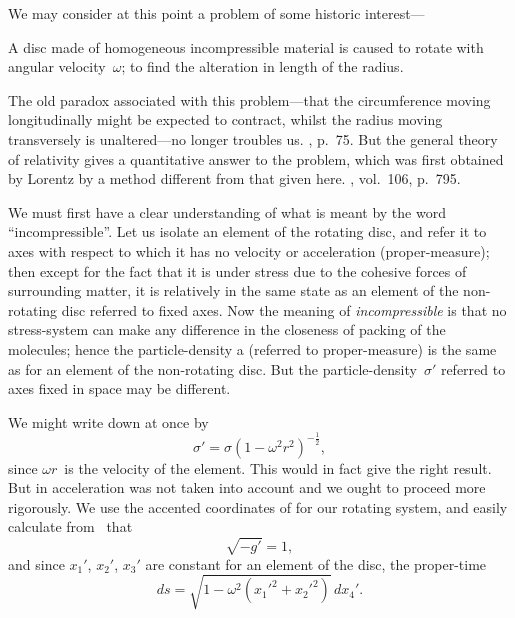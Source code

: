 \documentclass[12pt]{book}
\begin{document}
%
%

We may consider at this point a problem of some historic interest---

A disc made of homogeneous incompressible material is caused to rotate
with angular velocity~$\omega$; to find the alteration in length of the radius.

The old paradox associated with this problem---that the circumference
moving longitudinally might be expected to contract, whilst the radius moving
transversely is unaltered---no longer troubles us\footnotemark.\footnotetext
  {, p.~75.}
But the general theory of
relativity gives a quantitative answer to the problem, which was first obtained
by Lorentz by a method different from that given here\footnotemark.\footnotetext
  {, vol.~106, p.~795.}

We must first have a clear understanding of what is meant by the word
%
``incompressible''. Let us isolate an element of the rotating disc, and refer it to
axes with respect to which it has no velocity or acceleration (proper-measure);
then except for the fact that it is under stress due to the cohesive forces of
surrounding matter, it is relatively in the same state as an element of the
non-rotating disc referred to fixed axes. Now the meaning of \emph{incompressible}
is that no stress-system can make any difference in the closeness of packing
of the molecules; hence the particle-density a (referred to proper-measure)
is the same as for an element of the non-rotating disc. But the particle-density~$\sigma'$
referred to axes fixed in space may be different.

We might write down at once by~
\[
\sigma' = \sigma (1 - \omega^{2} r^{2})^{-\frac{1}{2}},
\]
since $\omega r$~is the velocity of the element. This would in fact give the right
result. But in  acceleration was not taken into account and we ought to
proceed more rigorously. We use the accented coordinates of  for our
rotating system, and easily calculate from~ that
\[
\sqrt{-g'} = 1,
\]
and since $x_{1}'$, $x_{2}'$, $x_{3}'$ are constant for an element of the disc, the proper-time
\[
ds = \sqrt{1 - \omega^{2}(x_{1}'^{2} + x_{2}'^{2})}\, dx_{4}'.
\]
\end{document}
